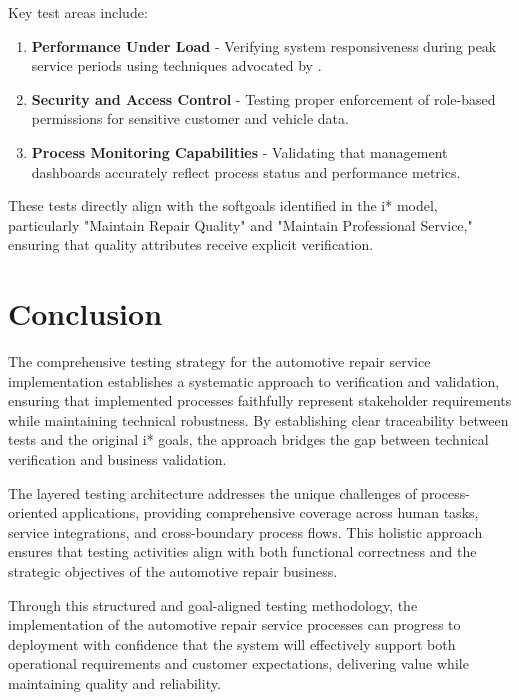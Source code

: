 \documentclass[14pt,a4paper]{article}
\begin{document}
Key test areas include:

\begin{enumerate}
    \item \textbf{Performance Under Load} - Verifying system responsiveness during peak service periods using techniques advocated by \textit{\parencite[p. 89]{Giray2016}}.

    \item \textbf{Security and Access Control} - Testing proper enforcement of role-based permissions for sensitive customer and vehicle data.

    \item \textbf{Process Monitoring Capabilities} - Validating that management dashboards accurately reflect process status and performance metrics.
\end{enumerate}

These tests directly align with the softgoals identified in the i* model, particularly "Maintain Repair Quality" and "Maintain Professional Service," ensuring that quality attributes receive explicit verification.

\section{Conclusion}

The comprehensive testing strategy for the automotive repair service implementation establishes a systematic approach to verification and validation, ensuring that implemented processes faithfully represent stakeholder requirements while maintaining technical robustness. By establishing clear traceability between tests and the original i* goals, the approach bridges the gap between technical verification and business validation.

The layered testing architecture addresses the unique challenges of process-oriented applications, providing comprehensive coverage across human tasks, service integrations, and cross-boundary process flows. This holistic approach ensures that testing activities align with both functional correctness and the strategic objectives of the automotive repair business.

Through this structured and goal-aligned testing methodology, the implementation of the automotive repair service processes can progress to deployment with confidence that the system will effectively support both operational requirements and customer expectations, delivering value while maintaining quality and reliability.

\newpage

\printbibliography
\end{document}
